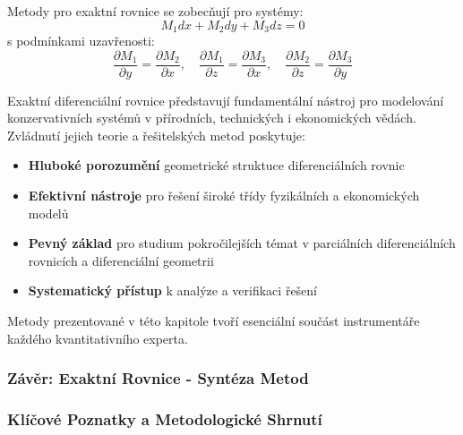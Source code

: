 \vspace{0.6\baselineskip}

\begin{transition}
Metody pro exaktní rovnice se zobecňují pro systémy:
\[
M_1 dx + M_2 dy + M_3 dz = 0
\]
s podmínkami uzavřenosti:
\[
\frac{\partial M_1}{\partial y} = \frac{\partial M_2}{\partial x}, \quad
\frac{\partial M_1}{\partial z} = \frac{\partial M_3}{\partial x}, \quad
\frac{\partial M_2}{\partial z} = \frac{\partial M_3}{\partial y}
\]
\end{transition}

\vspace{0.8\baselineskip}

\begin{conclusion}
Exaktní diferenciální rovnice představují fundamentální nástroj pro modelování konzervativních systémů v přírodních, technických i ekonomických vědách. Zvládnutí jejich teorie a řešitelských metod poskytuje:
\begin{itemize}
\item \textbf{Hluboké porozumění} geometrické struktuce diferenciálních rovnic
\item \textbf{Efektivní nástroje} pro řešení široké třídy fyzikálních a ekonomických modelů
\item \textbf{Pevný základ} pro studium pokročilejších témat v parciálních diferenciálních rovnicích a diferenciální geometrii
\item \textbf{Systematický přístup} k analýze a verifikaci řešení
\end{itemize}

Metody prezentované v této kapitole tvoří esenciální součást instrumentáře každého kvantitativního experta.
\end{conclusion}

\subsubsection{Závěr: Exaktní Rovnice - Syntéza Metod}
\label{subsec:zaver-exaktni}

\subsubsection{Klíčové Poznatky a Metodologické Shrnutí}
\label{subsubsec:klicove-poznatky-exaktni}

